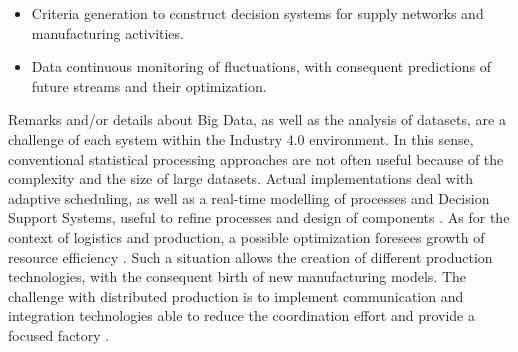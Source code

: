 \begin{itemize}
    \item Criteria generation to construct decision systems for supply networks and manufacturing activities.
    \item Data continuous monitoring of fluctuations, with consequent predictions of future streams and their optimization.
\end{itemize}
Remarks and/or details about Big Data, as well as the analysis of datasets, are a challenge of each system within the Industry 4.0 environment. In this sense, conventional statistical processing approaches are not often useful because of the complexity and the size of large datasets. Actual implementations deal with adaptive scheduling, as well as a real-time modelling of processes and Decision Support Systems, useful to refine processes and design of components \parencite{oliff_towards_2017}. As for the context of logistics and production, a possible optimization foresees growth of resource efficiency \parencite{hauder_optimization_2017}. Such a situation allows the creation of different production technologies, with the consequent birth of new manufacturing models. The challenge with distributed production is to implement communication and integration technologies able to reduce the coordination effort and provide a focused factory \parencite{khajavi_additive_2014}.
